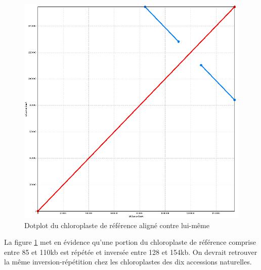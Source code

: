 \documentclass[a4paper]{article}
\begin{document}
\begin{figure}[H]
\centering
\includegraphics[scale=0.3] {Assemblage/chloroVSchloro.png}
\caption{Dotplot du chloroplaste de référence aligné contre lui-même}
\label{temoinchloro}
\end{figure}

La figure \ref{temoinchloro} met en évidence qu'une portion du chloroplaste de référence comprise entre 85 et 110kb est répétée et inversée entre 128 et 154kb. On devrait retrouver la même inversion-répétition chez les chloroplastes des dix accessions naturelles. 
\end{document}
